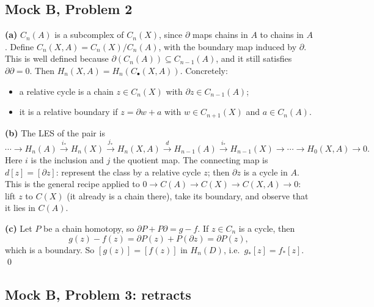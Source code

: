 \documentclass[11pt]{article}
\begin{document}
\subsection*{Mock B, Problem 2}

\textbf{(a)} $C_n(A)$ is a subcomplex of $C_n(X)$, since $\partial$ maps chains in $A$ to chains in $A$. Define $C_n(X,A)=C_n(X)/C_n(A)$, with the boundary map induced by $\partial$. This is well defined because $\partial(C_n(A))\subseteq C_{n-1}(A)$, and it still satisfies $\partial\partial=0$. Then $H_n(X,A)=H_n(C_\bullet(X,A))$. Concretely:
\begin{itemize}
\item a relative cycle is a chain $z\in C_n(X)$ with $\partial z\in C_{n-1}(A)$;
\item it is a relative boundary if $z=\partial w+a$ with $w\in C_{n+1}(X)$ and $a\in C_n(A)$.
\end{itemize}

\textbf{(b)} The LES of the pair is
\[\cdots\to H_n(A)\xrightarrow{i_*}H_n(X)\xrightarrow{j_*}H_n(X,A)\xrightarrow{d}H_{n-1}(A)\xrightarrow{i_*}H_{n-1}(X)\to\cdots\to H_0(X,A)\to0.\]
Here $i$ is the inclusion and $j$ the quotient map. The connecting map is $d[z]=[\partial z]$: represent the class by a relative cycle $z$; then $\partial z$ is a cycle in $A$. This is the general recipe applied to $0\to C(A)\to C(X)\to C(X,A)\to0$: lift $z$ to $C(X)$ (it already is a chain there), take its boundary, and observe that it lies in $C(A)$.

\textbf{(c)} Let $P$ be a chain homotopy, so $\partial P+P\partial=g-f$. If $z\in C_n$ is a cycle, then
\[g(z)-f(z)=\partial P(z)+P(\partial z)=\partial P(z),\]
which is a boundary. So $[g(z)]=[f(z)]$ in $H_n(D)$, i.e.\ $g_*[z]=f_*[z]$. \qed

\subsection*{Mock B, Problem 3: retracts}
\end{document}
